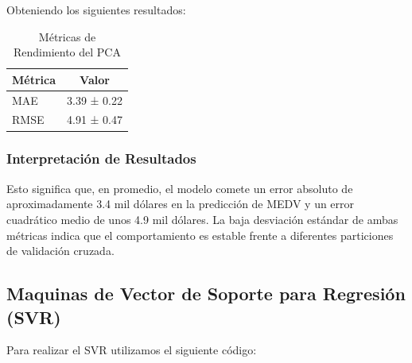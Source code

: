 \documentclass[12pt,a4paper]{article}
\begin{document}
Obteniendo los siguientes resultados:

\begin{table}[H]
\centering
\caption{Métricas de Rendimiento del PCA}\label{tab:pca_resultados}
\begin{tabular}{lc}
\toprule
\textbf{Métrica} & \textbf{Valor} \\
\midrule
MAE & 3.39 ± 0.22 \\
RMSE & 4.91 ± 0.47  \\
\bottomrule
\end{tabular}
\end{table}

\subsubsection{Interpretación de Resultados}

Esto significa que, en promedio, el modelo comete un error absoluto de aproximadamente 3.4 mil dólares en la predicción de MEDV y un error cuadrático medio de unos 4.9 mil dólares. La baja desviación estándar de ambas métricas indica que el comportamiento es estable frente a diferentes particiones de validación cruzada.
\vspace{1cm}

\subsection{Maquinas de Vector de Soporte para Regresión (SVR)}

Para realizar el SVR utilizamos el siguiente código:
\end{document}
